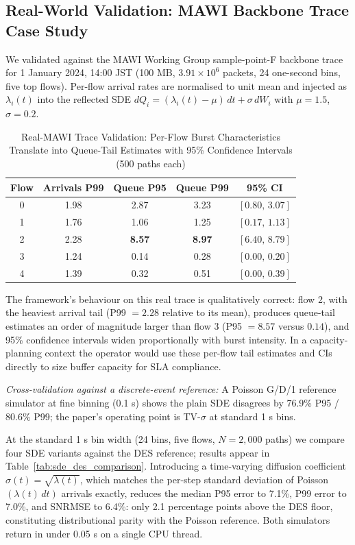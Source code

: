 \documentclass[journal]{IEEEtran}
\begin{document}
\subsection{Real-World Validation: MAWI Backbone Trace Case Study}
\label{subsec:mawi_validation}

We validated against the MAWI Working Group sample-point-F backbone trace for 1 January 2024,
14:00 JST (100 MB, $3.91\times10^{6}$ packets, 24 one-second bins, five top flows). Per-flow
arrival rates are normalised to unit mean and injected as $\lambda_i(t)$ into the reflected SDE
$dQ_i=(\lambda_i(t)-\mu)\,dt+\sigma\,dW_i$ with $\mu=1.5$, $\sigma=0.2$.

\begin{table}[!t]
\caption{Real-MAWI Trace Validation: Per-Flow Burst Characteristics Translate into Queue-Tail
Estimates with 95\% Confidence Intervals (500 paths each)}
\label{tab:mawi_validation}
\centering
\begin{tabular}{@{}c c c c c@{}}
\toprule
Flow & Arrivals P99 & Queue P95 & Queue P99 & 95\% CI \\
\midrule
0 & 1.98 & 2.87 & 3.23 & $[0.80,\,3.07]$ \\
1 & 1.76 & 1.06 & 1.25 & $[0.17,\,1.13]$ \\
2 & 2.28 & \textbf{8.57} & \textbf{8.97} & $[6.40,\,8.79]$ \\
3 & 1.24 & 0.14 & 0.28 & $[0.00,\,0.20]$ \\
4 & 1.39 & 0.32 & 0.51 & $[0.00,\,0.39]$ \\
\bottomrule
\end{tabular}
\end{table}

The framework's behaviour on this real trace is qualitatively correct: flow 2, with the
heaviest arrival tail (P99 $=2.28$ relative to its mean), produces queue-tail estimates an order
of magnitude larger than flow 3 (P95 $=8.57$ versus $0.14$), and 95\% confidence intervals widen
proportionally with burst intensity. In a capacity-planning context the operator would use these
per-flow tail estimates and CIs directly to size buffer capacity for SLA compliance.

\textit{Cross-validation against a discrete-event reference:}
A Poisson G/D/1 reference simulator at fine binning (0.1 s) shows the plain SDE disagrees by
76.9\% P95 / 80.6\% P99; the paper's operating point is TV-$\sigma$ at standard 1 s bins.

At the standard 1 s bin width (24 bins, five flows, $N=2{,}000$ paths) we compare four SDE
variants against the DES reference; results appear in Table~\ref{tab:sde_des_comparison}.
Introducing a time-varying diffusion coefficient $\sigma(t)=\sqrt{\lambda(t)}$, which matches
the per-step standard deviation of Poisson$(\lambda(t)\,dt)$ arrivals exactly, reduces the
median P95 error to 7.1\%, P99 error to 7.0\%, and SNRMSE to 6.4\%: only 2.1 percentage points
above the DES floor, constituting distributional parity with the Poisson reference. Both
simulators return in under 0.05 s on a single CPU thread.
\end{document}
